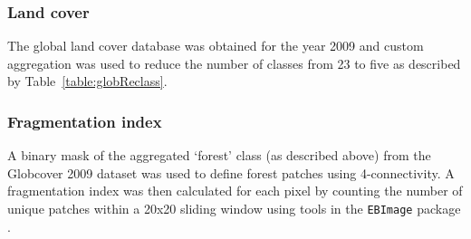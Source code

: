 \documentclass[9pt,twoside,lineno]{pnas-new}
\begin{document}
\subsubsection*{Land cover}
The global land cover database \cite{Olivier2012Global2009} was obtained for the year 2009 and custom aggregation was used to reduce the number of classes from 23 to five as described by Table~\ref{table:globReclass}.\par
\subsubsection*{Fragmentation index}
A binary mask of the aggregated `forest' class (as described above) from the Globcover 2009 dataset \cite{Olivier2012Global2009} was used to define forest patches using 4-connectivity. A fragmentation index was then calculated for each pixel by counting the number of unique patches within a 20x20 sliding window using tools in the \texttt{EBImage} package \cite{Pau2010EBImage---anPhenotypes}. \par
\end{document}
